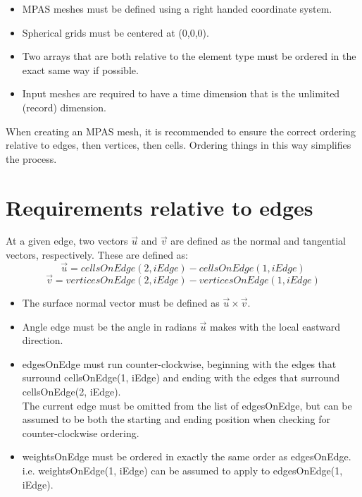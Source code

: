 \documentclass[11pt]{report}
\begin{document}
\begin{itemize}
	\item MPAS meshes must be defined using a right handed coordinate system.
	\item Spherical grids must be centered at (0,0,0).
	\item Two arrays that are both relative to the element type must be ordered in the exact same way if possible.
	\item Input meshes are required to have a time dimension that is the unlimited (record) dimension.
\end{itemize}

When creating an MPAS mesh, it is recommended to ensure the correct ordering
relative to edges, then vertices, then cells. Ordering things in this way
simplifies the process.

\section{Requirements relative to edges}

At a given edge, two vectors $\vec{u}$ and $\vec{v}$ are defined as the normal and tangential vectors, respectively. These are defined as:
\begin{equation}
	\vec{u} = cellsOnEdge(2, iEdge) - cellsOnEdge(1, iEdge)
\end{equation}
\begin{equation}
	\vec{v} = verticesOnEdge(2, iEdge) - verticesOnEdge(1, iEdge)
\end{equation}

\begin{itemize}
	\item The surface normal vector must be defined as $\vec{u} \times \vec{v}$.
	\item Angle edge must be the angle in radians $\vec{u}$ makes with the local eastward direction.
	\item edgesOnEdge must run counter-clockwise, beginning with the edges that surround cellsOnEdge(1, iEdge) and ending with the edges that surround cellsOnEdge(2, iEdge). \\
		  The current edge must be omitted from the list of edgesOnEdge, but can be assumed to be both the starting and ending position when checking for counter-clockwise ordering.
	\item weightsOnEdge must be ordered in exactly the same order as edgesOnEdge. i.e. weightsOnEdge(1, iEdge) can be assumed to apply to edgesOnEdge(1, iEdge).
\end{itemize}
\end{document}
